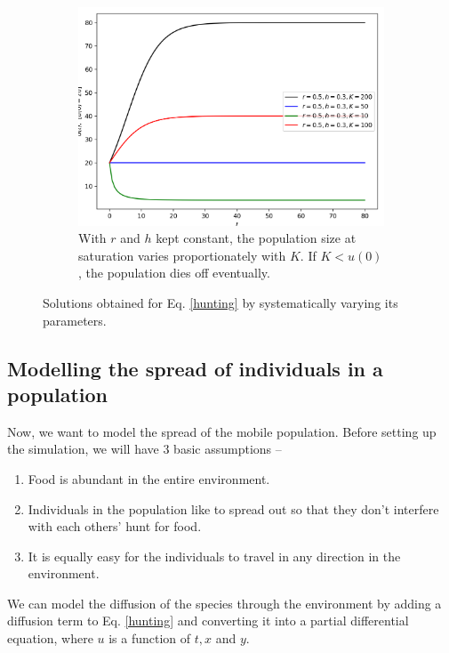 \begin{figure}[H]
\begin{subfigure}[b]{0.45\textwidth}
     \end{subfigure}
     \begin{subfigure}[b]{0.45\textwidth}
         \centering
         \includegraphics[width=\textwidth]{Figures/5/5a/varyK.png}
         \caption{With $r$ and $h$ kept constant, the population size at saturation varies proportionately with $K$. If $K<u(0)$, the population dies off eventually.}
     \end{subfigure}

    \caption{Solutions obtained for Eq. \ref{hunting} by systematically varying its parameters.}
\end{figure}

\subsection{Modelling the spread of individuals in a population}
Now, we want to model the spread of the mobile population. Before setting up the simulation, we will have 3 basic assumptions --

\begin{enumerate}
    \item Food is abundant in the entire environment.
    \item  Individuals in the population like to spread out so that they don’t interfere with each others’ hunt for food.
    \item It is equally easy for the individuals to travel in any direction in the environment.
\end{enumerate}

We can model the diffusion of the species through the environment by adding a diffusion term to Eq. \ref{hunting} and converting it into a partial differential equation, where $u$ is a function of $t, x$ and $y$. 

